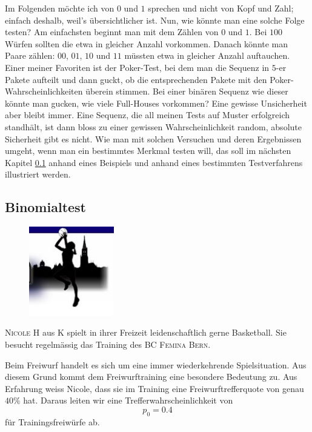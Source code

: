 \documentclass[%
11pt,%
twoside,%
titlepage,%
german,%
headsepline%
]{scrartcl}
\begin{document}
Im Folgenden möchte ich von $0$ und $1$ sprechen und nicht von Kopf und Zahl; einfach deshalb, weil's übersichtlicher ist.
Nun, wie könnte man eine solche Folge testen? Am einfachsten beginnt man mit dem Zählen von $0$ und $1$. Bei $100$ Würfen sollten die etwa in gleicher Anzahl vorkommen. Danach könnte man Paare zählen: $00$, $01$, $10$ und $11$ müssten etwa in gleicher Anzahl auftauchen. Einer meiner Favoriten ist der Poker-Test, bei dem man die Sequenz in $5$-er Pakete aufteilt und dann guckt, ob die entsprechenden Pakete mit den Poker-Wahrscheinlichkeiten überein stimmen. Bei einer binären Sequenz wie dieser könnte man gucken, wie viele Full-Houses vorkommen? Eine gewisse Unsicherheit aber bleibt immer. Eine Sequenz, die all meinen Tests auf Muster erfolgreich standhält, ist dann bloss zu einer gewissen Wahrscheinlichkeit random, absolute Sicherheit gibt es nicht. Wie man mit solchen Versuchen und deren Ergebnissen umgeht, wenn man ein bestimmtes Merkmal testen will, das soll im nächsten Kapitel \ref{subsec:bspfreiw} anhand eines Beispiels und anhand eines bestimmten Testverfahrens illustriert werden.

\subsection{Binomialtest}\label{subsec:bspfreiw}

\begin{figure}
  \begin{center}
    \includegraphics[width=0.33\textwidth]{pictures/bcfemina}
  \end{center}
\end{figure}
\textsc{Nicole H} aus K spielt in ihrer Freizeit leidenschaftlich gerne Basketball. Sie besucht regelmässig das Training des \textsc{BC Femina Bern}.

Beim Freiwurf handelt es sich um eine immer wiederkehrende Spielsituation. Aus diesem Grund kommt dem Freiwurftraining eine besondere Bedeutung zu. Aus Erfahrung weiss Nicole, dass sie im Training eine Freiwurftrefferquote von genau $40\%$ hat. Daraus leiten wir eine Trefferwahrscheinlichkeit von
$$p_0=0.4$$
für Trainingsfreiwürfe ab.
\end{document}
